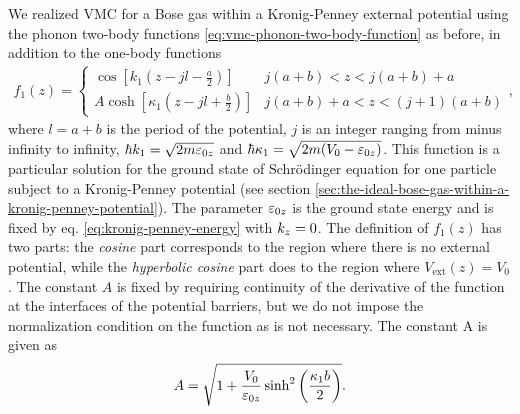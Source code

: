 We realized VMC for a Bose gas within a Kronig-Penney external potential using
the phonon two-body functions \eqref{eq:vmc-phonon-two-body-function} as before,
in addition to the one-body functions
%
\begin{align}
	f_1(z) = \begin{cases}
		\cos \left[k_1 \left(z - jl - \frac{a}{2} \right)\right] & j(a + b) < z < j(a+b) + a \\
		A \cosh\left[\kappa_1 \left(z - jl + \frac{b}{2} \right) \right] &  j(a + b) + a < z < (j+1)(a + b)
	\end{cases},
\end{align}
%
where $l = a + b$ is the period of the potential, $j$ is an integer ranging from
minus infinity to infinity, $\hbar k_1 = \sqrt{2m\ez[0]}$ and $\hbar \kappa_1 =
\sqrt{2m(V_0 - \ez[0])}$. This function is a particular solution for the ground
state of Schrödinger equation for one particle subject to a Kronig-Penney
potential (see section
\ref{sec:the-ideal-bose-gas-within-a-kronig-penney-potential}). The parameter
$\ez[0]$ is the ground state energy and is fixed by eq.
\eqref{eq:kronig-penney-energy} with $\kz = 0$. The definition of $f_1(z)$ has
two parts: the \textit{cosine} part corresponds to the region where there is no
external potential, while the \textit{hyperbolic cosine} part does to the region
where $V_\mathrm{ext}(z) = V_0$. The constant $A$ is fixed by requiring
continuity of the derivative of the function at the interfaces of the potential
barriers, but we do not impose the normalization condition on the function as is
not necessary. The constant A is given as
%
\begin{equation}
	A = \sqrt{1 + \frac{V_0}{\ez[0]} \sinh^2\left( \frac{\kappa_1 b}{2} \right)}.
\end{equation}

